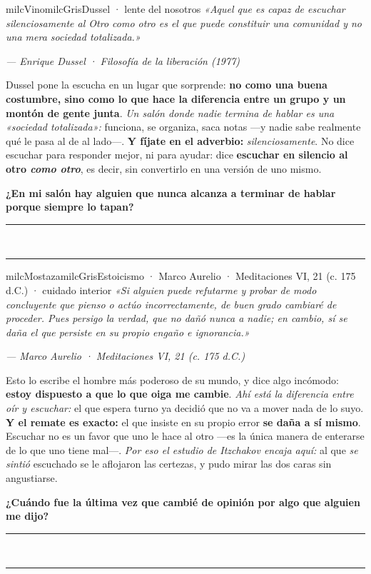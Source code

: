 \documentclass[11pt,letterpaper]{article}
\newcommand{\linead}[1]{\noindent\color{milcLinea}\rule{#1}{0.5pt}\color{milcNegro}}
\begin{document}
\begin{softbox}{milcVino}{milcGris}{Dussel · lente del nosotros}
\textit{«Aquel que es capaz de escuchar silenciosamente al Otro como otro es el que puede constituir una comunidad y no una mera sociedad totalizada.»}

{\footnotesize\itshape\color{milcNegro!70}--- Enrique Dussel · Filosofía de la liberación (1977)}

Dussel pone la escucha en un lugar que sorprende: \textbf{no como una buena costumbre, sino como lo que hace la diferencia entre un grupo y un montón de gente junta}. \emph{Un salón donde nadie termina de hablar es una «sociedad totalizada»:} funciona, se organiza, saca notas ---y nadie sabe realmente qué le pasa al de al lado---. \textbf{Y fíjate en el adverbio:} \emph{silenciosamente}. No dice escuchar para responder mejor, ni para ayudar: dice \textbf{escuchar en silencio al otro \emph{como otro}}, es decir, sin convertirlo en una versión de uno mismo.

\textbf{¿En mi salón hay alguien que nunca alcanza a terminar de hablar porque siempre lo tapan?}
\end{softbox}
\linead{\linewidth}\\[1mm]
\linead{\linewidth}

\begin{softbox}{milcMostaza}{milcGris}{Estoicismo · Marco Aurelio · Meditaciones VI, 21 (c. 175 d.C.) · cuidado interior}
\textit{«Si alguien puede refutarme y probar de modo concluyente que pienso o actúo incorrectamente, de buen grado cambiaré de proceder. Pues persigo la verdad, que no dañó nunca a nadie; en cambio, sí se daña el que persiste en su propio engaño e ignorancia.»}

{\footnotesize\itshape\color{milcNegro!70}--- Marco Aurelio · Meditaciones VI, 21 (c. 175 d.C.)}

Esto lo escribe el hombre más poderoso de su mundo, y dice algo incómodo: \textbf{estoy dispuesto a que lo que oiga me cambie}. \emph{Ahí está la diferencia entre oír y escuchar:} el que espera turno ya decidió que no va a mover nada de lo suyo. \textbf{Y el remate es exacto:} el que insiste en su propio error \textbf{se daña a sí mismo}. Escuchar no es un favor que uno le hace al otro ---es la única manera de enterarse de lo que uno tiene mal---. \emph{Por eso el estudio de Itzchakov encaja aquí:} al que \emph{se sintió} escuchado se le aflojaron las certezas, y pudo mirar las dos caras sin angustiarse.

\textbf{¿Cuándo fue la última vez que cambié de opinión por algo que alguien me dijo?}
\end{softbox}
\linead{\linewidth}\\[1mm]
\linead{\linewidth}
\end{document}
